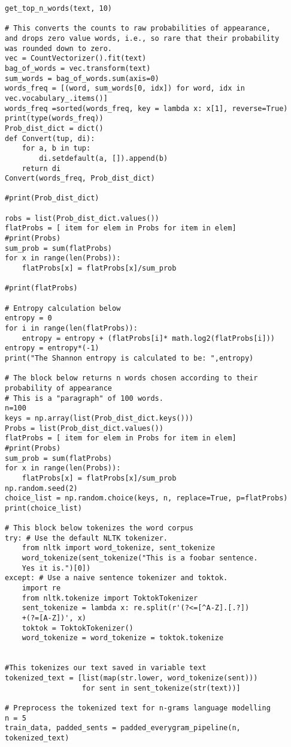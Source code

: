 \documentclass[12pt]{article}%
\begin{document}
\begin{lstlisting}
get_top_n_words(text, 10)

# This converts the counts to raw probabilities of appearance,
and drops zero value words, i.e., so rare that their probability
was rounded down to zero.
vec = CountVectorizer().fit(text)
bag_of_words = vec.transform(text)
sum_words = bag_of_words.sum(axis=0) 
words_freq = [(word, sum_words[0, idx]) for word, idx in 
vec.vocabulary_.items()]
words_freq =sorted(words_freq, key = lambda x: x[1], reverse=True)
print(type(words_freq))
Prob_dist_dict = dict()
def Convert(tup, di): 
    for a, b in tup: 
        di.setdefault(a, []).append(b) 
    return di 
Convert(words_freq, Prob_dist_dict)

#print(Prob_dist_dict)

robs = list(Prob_dist_dict.values())
flatProbs = [ item for elem in Probs for item in elem]
#print(Probs)
sum_prob = sum(flatProbs)
for x in range(len(Probs)):
    flatProbs[x] = flatProbs[x]/sum_prob

#print(flatProbs)

# Entropy calculation below
entropy = 0
for i in range(len(flatProbs)):
    entropy = entropy + (flatProbs[i]* math.log2(flatProbs[i]))
entropy = entropy*(-1)
print("The Shannon entropy is calculated to be: ",entropy)

# The block below returns n words chosen according to their
probability of appearance
# This is a "paragraph" of 100 words.
n=100
keys = np.array(list(Prob_dist_dict.keys()))
Probs = list(Prob_dist_dict.values())
flatProbs = [ item for elem in Probs for item in elem]
#print(Probs)
sum_prob = sum(flatProbs)
for x in range(len(Probs)):
    flatProbs[x] = flatProbs[x]/sum_prob
np.random.seed(2)
choice_list = np.random.choice(keys, n, replace=True, p=flatProbs)
print(choice_list)

# This block below tokenizes the word corpus
try: # Use the default NLTK tokenizer.
    from nltk import word_tokenize, sent_tokenize 
    word_tokenize(sent_tokenize("This is a foobar sentence.
    Yes it is.")[0])
except: # Use a naive sentence tokenizer and toktok.
    import re
    from nltk.tokenize import ToktokTokenizer
    sent_tokenize = lambda x: re.split(r'(?<=[^A-Z].[.?]) 
    +(?=[A-Z])', x)
    toktok = ToktokTokenizer()
    word_tokenize = word_tokenize = toktok.tokenize


#This tokenizes our text saved in variable text
tokenized_text = [list(map(str.lower, word_tokenize(sent))) 
                  for sent in sent_tokenize(str(text))]

# Preprocess the tokenized text for n-grams language modelling
n = 5
train_data, padded_sents = padded_everygram_pipeline(n,
tokenized_text)



\end{lstlisting}
\end{document}
